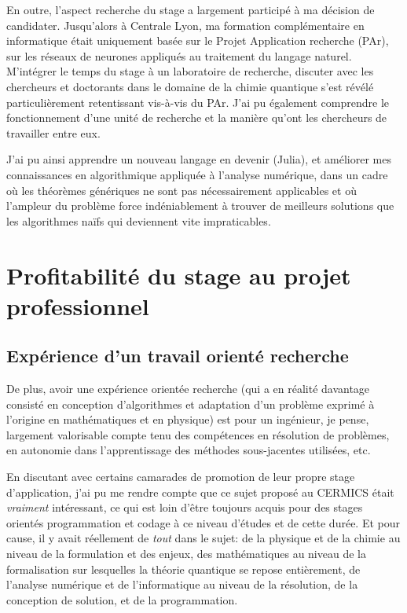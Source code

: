 \documentclass[svgnames,dvipsnames,a4paper,10pt,french]{report}
\begin{document}
En outre, l'aspect recherche du stage a largement participé à ma décision de candidater. Jusqu'alors à Centrale Lyon, ma formation complémentaire en informatique était uniquement basée sur le Projet Application recherche (PAr), sur les réseaux de neurones appliqués au traitement du langage naturel. M'intégrer le temps du stage à un laboratoire de recherche, discuter avec les chercheurs et doctorants dans le domaine de la chimie quantique s'est révélé particulièrement retentissant vis-à-vis du PAr. J'ai pu également comprendre le fonctionnement d'une unité de recherche et la manière qu'ont les chercheurs de travailler  entre eux.


J'ai pu ainsi apprendre un nouveau langage en devenir (Julia), et améliorer mes connaissances en algorithmique appliquée à l'analyse numérique, dans un cadre où les théorèmes génériques ne sont pas nécessairement applicables et où l'ampleur du problème  force indéniablement à trouver de meilleurs solutions que les algorithmes naïfs qui deviennent vite impraticables.

\section{Profitabilité du stage au projet professionnel}

\subsection{Expérience d'un travail orienté recherche}
De plus, avoir une expérience orientée recherche (qui a en réalité davantage consisté en conception d'algorithmes et adaptation d'un problème exprimé à l'origine en mathématiques et en physique) est pour un ingénieur, je pense, largement valorisable compte tenu des compétences en résolution de problèmes, en autonomie dans l'apprentissage des méthodes sous-jacentes utilisées, etc.

En discutant avec certains camarades de promotion de leur propre stage d'application, j'ai pu me rendre compte que ce sujet proposé au CERMICS était \emph{vraiment} intéressant, ce qui est loin d'être toujours acquis pour des stages orientés programmation et codage à ce niveau d'études et de cette durée. Et pour cause, il y avait réellement de \emph{tout} dans le sujet: de la physique et de la chimie au niveau de la formulation et des enjeux, des mathématiques au niveau de la formalisation sur lesquelles la théorie quantique se repose entièrement, de l'analyse numérique et de l'informatique au niveau de la résolution, de la conception de solution, et de la programmation. 
\end{document}
